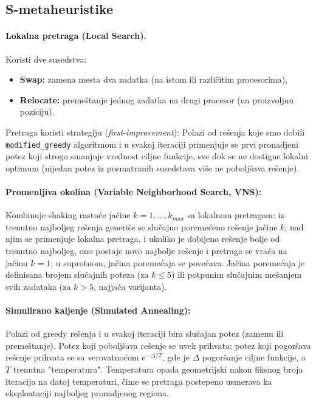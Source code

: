 \documentclass{article}
\begin{document}
\subsection{S-metaheuristike}

\paragraph{Lokalna pretraga (Local Search).} Koristi dve susedstva:
\begin{itemize}
    \item \textbf{Swap:} zamena mesta dva zadatka (na istom ili
        različitim procesorima),
    \item \textbf{Relocate:} premeštanje jednog zadatka na
        drugi procesor (na proizvoljnu poziciju).
\end{itemize}
Pretraga koristi strategiju (\textit{first-improvement}):
Polazi od rešenja koje smo dobili \texttt{modified\_greedy} algoritmom i 
u svakoj iteraciji primenjuje se prvi pronadjeni potez koji strogo smanjuje
vrednost ciljne funkcije, sve dok se ne dostigne lokalni optimum (nijedan
potez iz posmatranih susedstava više ne poboljšava rešenje). 

\paragraph{Promenljiva okolina (Variable Neighborhood Search, VNS):}
Kombinuje shaking rastuće jačine $k=1,\dots,k_{max}$ sa
lokalnom pretragom: iz trenutno najboljeg rešenja generiše se slučajno
poremećeno rešenje jačine $k$, nad njim se primenjuje lokalna pretraga, i
ukoliko je dobijeno rešenje bolje od trenutno najboljeg, ono postaje novo
najbolje rešenje i pretraga se vraća na jačinu $k=1$; u suprotnom, jačina
poremećaja se povećava. Jačina poremećaja je definisana brojem slučajnih
poteza (za $k \le 5$) ili potpunim slučajnim mešanjem svih zadataka (za
$k > 5$, najjača varijanta).

\paragraph{Simulirano kaljenje (Simulated Annealing):} Polazi od
greedy rešenja i u svakoj iteraciji bira slučajan potez (zamenu ili
premeštanje). Potez koji poboljšava rešenje se uvek prihvata; potez koji
pogoršava rešenje prihvata se sa verovatnoćom $e^{-\Delta / T}$, gde je
$\Delta$ pogoršanje ciljne funkcije, a $T$ trenutna "temperatura".
Temperatura opada geometrijski nakon fiksnog broja
iteracija na datoj temperaturi, čime se pretraga postepeno usmerava ka
eksploataciji najboljeg pronadjenog regiona.
\end{document}
